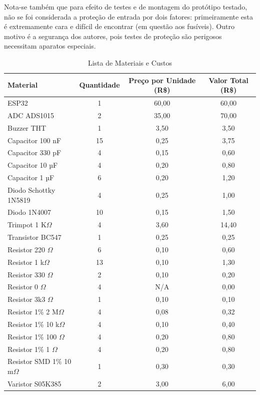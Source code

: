 Nota-se também que para efeito de testes e de montagem do protótipo testado, não se foi considerada a proteção de entrada por dois fatores: primeiramente esta é extremamente cara e difícil de encontrar (em questão aos fusíveis). Outro motivo é a segurança dos autores, pois testes de proteção são perigosos necessitam aparatos especiais.

\begin{table}[h!]
\centering
\caption{Lista de Materiais e Custos}
\label{tab:Bookofmaterials}
\begin{tabular}{|l|c|c|c|}
\hline
\textbf{Material} & \textbf{Quantidade} & \textbf{Preço por Unidade (R\$)} & \textbf{Valor Total (R\$)} \\ \hline
ESP32 & 1 & 60,00 & 60,00 \\ \hline
ADC ADS1015 & 2 & 35,00 & 70,00 \\ \hline
Buzzer THT & 1 & 3,50 & 3,50 \\ \hline
Capacitor 100 nF & 15 & 0,25 & 3,75 \\ \hline
Capacitor 330 pF & 4 & 0,15 & 0,60 \\ \hline
Capacitor 10 µF & 4 & 0,20 & 0,80 \\ \hline
Capacitor 1 µF & 6 & 0,20 & 1,20 \\ \hline
Diodo Schottky 1N5819 & 4 & 0,25 & 1,00 \\ \hline
Diodo 1N4007 & 10 & 0,15 & 1,50 \\ \hline
Trimpot 1 K$\Omega$ & 4 & 3,60 & 14,40 \\ \hline
Transistor BC547 & 1 & 0,25 & 0,25 \\ \hline
Resistor 220 $\Omega$ & 6 & 0,10 & 0,60 \\ \hline
Resistor 1 k$\Omega$ & 13 & 0,10 & 1,30 \\ \hline
Resistor 330 $\Omega$ & 2 & 0,10 & 0,20 \\ \hline
Resistor 0 $\Omega$ & 4 & N/A & 0,00 \\ \hline
Resistor 3k3 $\Omega$ & 1 & 0,10 & 0,10 \\ \hline
Resistor 1\% 2 M$\Omega$ & 4 & 0,08 & 0,32 \\ \hline
Resistor 1\% 10 k$\Omega$ & 4 & 0,10 & 0,40 \\ \hline
Resistor 1\% 100 $\Omega$ & 4 & 0,20 & 0,80 \\ \hline
Resistor 1\% 1 $\Omega$ & 4 & 0,20 & 0,80 \\ \hline
Resistor SMD 1\% 10 m$\Omega$ & 1 & 0,30 & 0,30 \\ \hline
Varistor S05K385 & 2 & 3,00 & 6,00 \\ \hline

\end{tabular}
\end{table}
